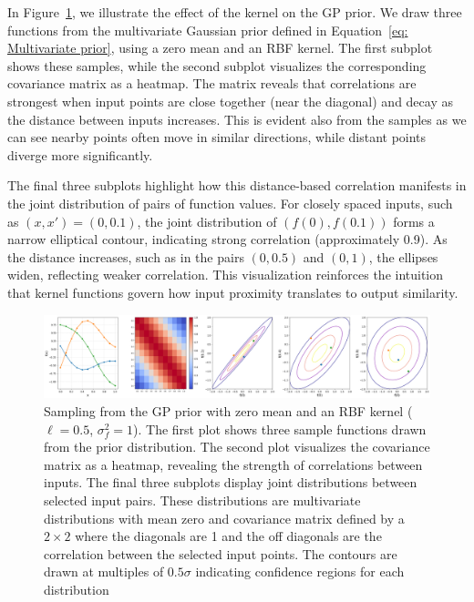 \documentclass{ucdgradtaughtthesis}
\begin{document}
\vspace{1em}
\noindent
In Figure~\ref{fig: samples_from_GP_prior}, we illustrate the effect of the kernel on the GP prior.
We draw three functions from the multivariate Gaussian prior defined in Equation~\ref{eq: Multivariate prior}, using a zero mean and an RBF kernel.
The first subplot shows these samples, while the second subplot visualizes the corresponding covariance matrix as a heatmap.
The matrix reveals that correlations are strongest when input points are close together (near the diagonal) and decay as the distance between inputs increases.
This is evident also from the samples as we can see nearby points often move in similar directions, while distant points diverge more significantly.

\vspace{1em}
\noindent
The final three subplots highlight how this distance-based correlation manifests in the joint distribution of pairs of function values.
For closely spaced inputs, such as \( (x, x') = (0, 0.1) \), the joint distribution of \( (f(0), f(0.1)) \) forms a narrow elliptical contour,
indicating strong correlation (approximately 0.9). As the distance increases, such as in the pairs \( (0, 0.5) \) and \( (0, 1) \), the ellipses widen, reflecting weaker correlation. This visualization reinforces the intuition that kernel functions govern how input proximity translates to output similarity.

\begin{figure}[H]
    \centering
       \includegraphics[width=\textwidth]{LatexPlots/1dplots/Kernel_background.png}
        \caption[Visualising the assumptions the kernel encodes into our GP process.]{Sampling from the GP prior with zero mean and an RBF kernel ($\ell = 0.5$, $\sigma_f^2 = 1$). 
        The first plot shows three sample functions drawn from the prior distribution. 
        The second plot visualizes the covariance matrix as a heatmap, revealing the strength of correlations between inputs.
        The final three subplots display joint distributions between selected input pairs. These distributions are multivariate distributions with mean zero and covariance matrix defined by a \(2 \times 2\) where the diagonals are 1 and the off diagonals are the correlation between the selected input points.
        The contours are drawn at multiples of \(0.5 \sigma\) indicating confidence regions for each distribution}
    \label{fig: samples_from_GP_prior}
\end{figure}
\end{document}
